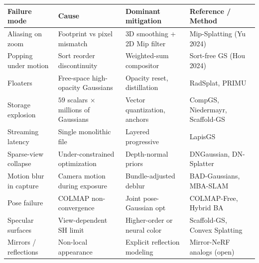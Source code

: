 {\def\LTcaptype{none} %
\begin{longtable}[]{@{}
  >{\raggedright\arraybackslash}p{}
  >{\raggedright\arraybackslash}p{}
  >{\raggedright\arraybackslash}p{}
  >{\raggedright\arraybackslash}p{}@{}}
\toprule\noalign{}
\begin{minipage}[b]{\linewidth}\raggedright
\textbf{Failure mode}
\end{minipage} & \begin{minipage}[b]{\linewidth}\raggedright
\textbf{Cause}
\end{minipage} & \begin{minipage}[b]{\linewidth}\raggedright
\textbf{Dominant mitigation}
\end{minipage} & \begin{minipage}[b]{\linewidth}\raggedright
\textbf{Reference / Method}
\end{minipage} \\
\midrule\noalign{}
\endhead
\bottomrule\noalign{}
\endlastfoot
Aliasing on zoom & Footprint vs pixel mismatch & 3D smoothing + 2D Mip filter & Mip-Splatting (Yu 2024) \\
Popping under motion & Sort reorder discontinuity & Weighted-sum compositor & Sort-free GS (Hou 2024) \\
Floaters & Free-space high-opacity Gaussians & Opacity reset, distillation & RadSplat, PRIMU \\
Storage explosion & \(59\) scalars × millions of Gaussians & Vector quantization, anchors & CompGS, Niedermayr, Scaffold-GS \\
Streaming latency & Single monolithic file & Layered progressive & LapisGS \\
Sparse-view collapse & Under-constrained optimization & Depth-normal priors & DNGaussian, DN-Splatter \\
Motion blur in capture & Camera motion during exposure & Bundle-adjusted deblur & BAD-Gaussians, MBA-SLAM \\
Pose failure & COLMAP non-convergence & Joint pose-Gaussian opt & COLMAP-Free, Hybrid BA \\
Specular surfaces & View-dependent SH limit & Higher-order or neural color & Scaffold-GS, Convex Splatting \\
Mirrors / reflections & Non-local appearance & Explicit reflection modeling & Mirror-NeRF analogs (open) \\

\end{longtable}}
